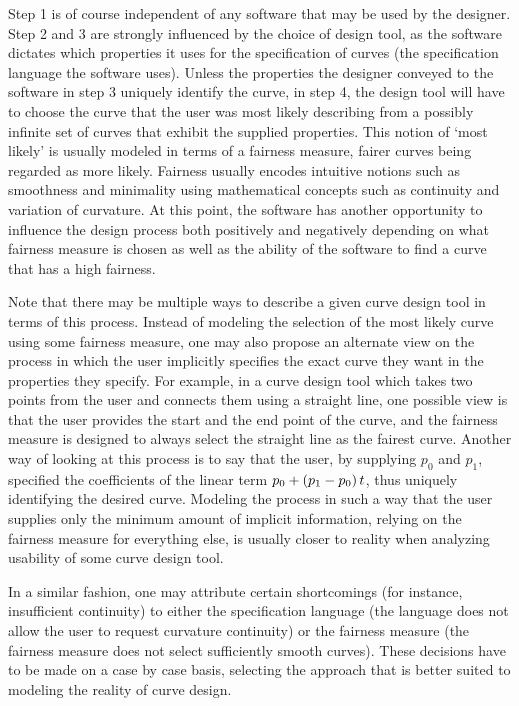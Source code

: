 \documentclass[a4paper]{article}
\begin{document}
			Step 1 is of course independent of any software that may be used by the designer. Step 2 and 3 are strongly influenced by the choice of design tool, as the software dictates which properties it uses for the specification of curves (the specification language the software uses). Unless the properties the designer conveyed to the software in step 3 uniquely identify the curve, in step 4, the design tool will have to choose the curve that the user was most likely describing from a possibly infinite set of curves that exhibit the supplied properties. This notion of `most likely' is usually modeled in terms of a fairness measure, fairer curves being regarded as more likely. Fairness usually encodes intuitive notions such as smoothness and minimality using mathematical concepts such as continuity and variation of curvature. At this point, the software has another opportunity to influence the design process both positively and negatively depending on what fairness measure is chosen as well as the ability of the software to find a curve that has a high fairness.

			Note that there may be multiple ways to describe a given curve design tool in terms of this process. Instead of modeling the selection of the most likely curve using some fairness measure, one may also propose an alternate view on the process in which the user implicitly specifies the exact curve they want in the properties they specify. For example, in a curve design tool which takes two points from the user and connects them using a straight line, one possible view is that the user provides the start and the end point of the curve, and the fairness measure is designed to always select the straight line as the fairest curve. Another way of looking at this process is to say that the user, by supplying \(p_0\) and \(p_1\), specified the coefficients of the linear term \(p_0 + \left( p_1 - p_0 \right) t\), thus uniquely identifying the desired curve. Modeling the process in such a way that the user supplies only the minimum amount of implicit information, relying on the fairness measure for everything else, is usually closer to reality when analyzing usability of some curve design tool.

			In a similar fashion, one may attribute certain shortcomings (for instance, insufficient continuity) to either the specification language (the language does not allow the user to request curvature continuity) or the fairness measure (the fairness measure does not select sufficiently smooth curves). These decisions have to be made on a case by case basis, selecting the approach that is better suited to modeling the reality of curve design.
\end{document}
